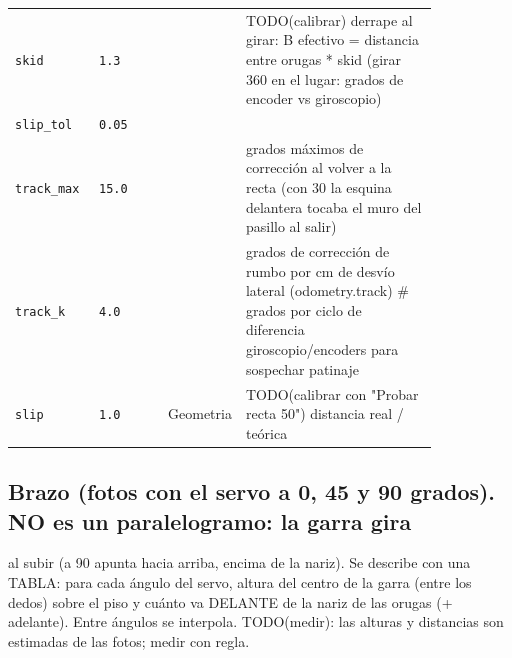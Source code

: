 \begin{longtable}{@{}p{0.2\linewidth}p{0.17\linewidth}lp{0.47\linewidth}@{}}
\texttt{skid} & \texttt{1.3} &  & TODO(calibrar) derrape al girar: B efectivo = distancia entre orugas * skid (girar 360\textdegree{} en el lugar: grados de encoder vs giroscopio) \\
\texttt{slip\_\allowbreak{}tol} & \texttt{0.05} &  &  \\
\texttt{track\_\allowbreak{}max} & \texttt{15.0} &  & grados máximos de corrección al volver a la recta (con 30 la esquina delantera tocaba el muro del pasillo al salir) \\
\texttt{track\_\allowbreak{}k} & \texttt{4.0} &  & grados de corrección de rumbo por cm de desvío lateral (odometry.track)        \# grados por ciclo de diferencia giroscopio/encoders para sospechar patinaje \\
\texttt{slip} & \texttt{1.0} & Geometria & TODO(calibrar con "Probar recta 50") distancia real / teórica \\
\bottomrule\end{longtable}
\subsection*{Brazo (fotos con el servo a 0, 45 y 90 grados). NO es un paralelogramo: la garra gira}
al subir (a 90\textdegree{} apunta hacia arriba, encima de la nariz). Se describe con una TABLA: para cada ángulo del servo, altura del centro de la garra (entre los dedos) sobre el piso y cuánto va DELANTE de la nariz de las orugas (+ adelante). Entre ángulos se interpola. TODO(medir): las alturas y distancias son estimadas de las fotos; medir con regla.

